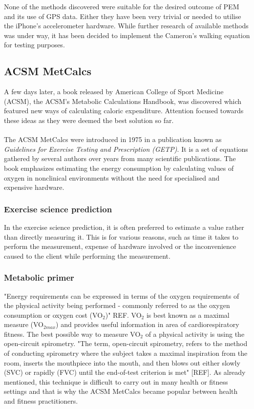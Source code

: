 \documentclass[12pt, a4paper]{report}   %
\begin{document}
\begin{enumerate}
None of the methods discovered were suitable for the desired outcome of PEM and its use of GPS data. Either they have been very trivial or needed to utilise the iPhone's accelerometer hardware. While further research of available methods was under way, it has been decided to implement the Cameron's walking equation for testing purposes.

\clearpage
\subsection{ACSM MetCalcs}
A few days later, a book released by American College of Sport Medicine (ACSM), the ACSM's Metabolic Calculations Handbook, was discovered which featured new ways of calculating caloric expenditure. Attention focused towards these ideas as they were deemed the best solution so far.
\\ \\
The ACSM MetCalcs were introduced in 1975 in a publication known as \textit{Guidelines for Exercise Testing and Prescription (GETP)}. It is a set of equations gathered by several authors over years from many scientific publications. The book emphasizes estimating the energy consumption by calculating values of oxygen in nonclinical environments without the need for specialised and expensive hardware.

\subsubsection{Exercise science prediction}
In the exercise science prediction, it is often preferred to estimate a value rather than directly measuring it. This is for various reasons, such as time it takes to perform the measurement, expense of hardware involved or the inconvenience caused to the client while performing the measurement.

\subsubsection{Metabolic primer}
"Energy requirements can be expressed in terms of the oxygen requirements of the physical activity being performed - commonly referred to as the oxygen consumption or oxygen cost (VO$_{2}$)" REF. VO$_{2}$ is best known as a maximal measure (VO$_{2 max}$) and provides useful information in area of cardiorespiratory fitness. The best possible way to measure VO$_{2}$ of a physical activity is using the open-circuit spirometry. "The term, open-circuit spirometry, refers to the method of conducting spirometry where the subject takes a maximal inspiration from the room, inserts the mouthpiece into the mouth, and then blows out either slowly (SVC) or rapidly (FVC) until the end-of-test criterion is met" [REF]. As already mentioned, this technique is difficult to carry out in many health or fitness settings and that is why the ACSM MetCalcs became popular between health and fitness practitioners.


\end{enumerate}
\end{document}
